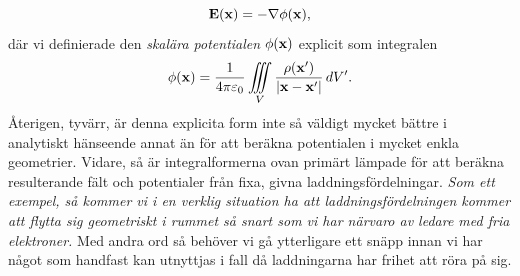 {\hl{$$
  {\bf E}({\bf x})=-\nabla\phi({\bf x}),
$$}
d{\"a}r vi definierade den {\it skal{\"a}ra potentialen} $\phi({\bf x})$
explicit som integralen
\hl{$$
  \phi({\bf x})={{1}\over{4\pi\varepsilon_0}}\iiint_V
    {{\rho({\bf x}')}\over{|{\bf x}-{\bf x}'|}}\,dV'.
$$}
{\AA}terigen, tyv{\"a}rr, {\"a}r denna explicita form inte s{\aa} v{\"a}ldigt
mycket b{\"a}ttre i analytiskt h{\"a}nseende annat {\"a}n f{\"o}r att
ber{\"a}kna potentialen i mycket enkla geometrier. Vidare, s{\aa} {\"a}r
integralformerna ovan prim{\"a}rt l{\"a}mpade f{\"o}r att ber{\"a}kna
resulterande f{\"a}lt och potentialer fr{\aa}n fixa, givna
laddnings\-f{\"o}r\-del\-ningar. {\it Som ett exempel, s{\aa} kommer vi i en
verklig situation ha att laddningsf{\"o}rdelningen kommer att flytta sig
geometriskt i rummet s{\aa} snart som vi har n{\"a}rvaro av ledare med fria
elektroner.}
Med andra ord s{\aa} beh{\"o}ver vi g{\aa} ytterligare ett sn{\"a}pp innan vi
har n{\aa}got som handfast kan utnyttjas i fall d{\aa} laddningarna har frihet
att r{\"o}ra p{\aa} sig.

}
